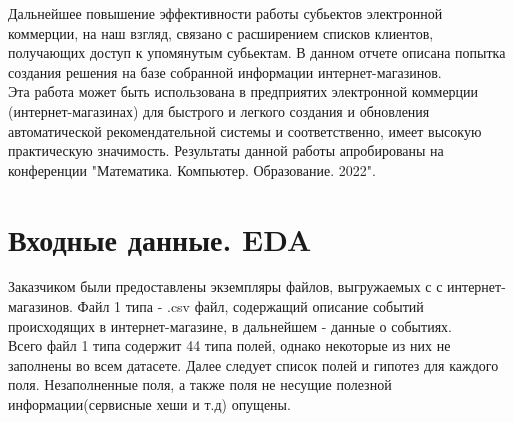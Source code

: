 \documentclass[14pt]{mmcs_article}
\begin{document}
Дальнейшее повышение эффективности работы субьектов электронной коммерции, на наш взгляд, связано с расширением списков клиентов, получающих доступ к упомянутым субьектам. В данном отчете описана попытка создания решения на базе собранной информации интернет-магазинов. \\
Эта работа может быть использована в предприятих электронной коммерции (интернет-магазинах) для быстрого и легкого создания и обновления автоматической рекомендательной системы и соответственно, имеет высокую практическую значимость.
Результаты данной работы апробированы на конференции "Математика. Компьютер. Образование. 2022".

\newpage
\section{Входные данные. EDA}\label{dsfs}
Заказчиком были предоставлены экземпляры файлов, выгружаемых с с интернет-магазинов. 
Файл 1 типа - .csv  файл, содержащий описание событий происходящих в интернет-магазине, в дальнейшем - данные о событиях. \\
Всего файл 1 типа содержит 44 типа полей, однако некоторые из них не заполнены во всем датасете. Далее следует список полей и гипотез для каждого поля. Незаполненные поля, а также поля не несущие полезной информации(сервисные хеши и т.д) опущены.
\end{document}
